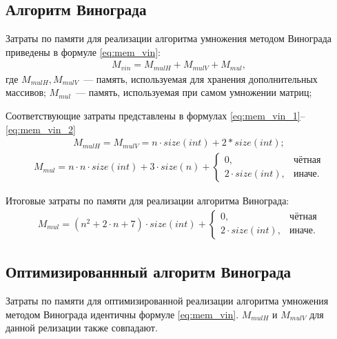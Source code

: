 \subsection*{Алгоритм Винограда}
Затраты по памяти для реализации алгоритма умножения методом Винограда приведены в формуле \ref{eq:mem_vin}:
\begin{equation}
	\label{eq:mem_vin}
	\begin{gathered}
		M_{vin} = M_{mulH} + M_{mulV} + M_{mul},
	\end{gathered}
\end{equation}
где $M_{mulH}, M_{mulV}$~--- память, используемая для хранения дополнительных массивов;
\newline $M_{mul}$~--- память, используемая при самом умножении матриц;

Соответствующие затраты представлены в формулах \ref{eq:mem_vin_1}--\ref{eq:mem_vin_2}
\begin{equation}
	\label{eq:mem_vin_1}
	\begin{gathered}
		M_{mulH} = M_{mulV} = n \cdot size(int) + 2 * size(int);
	\end{gathered}
\end{equation}
\begin{equation}
	\label{eq:mem_vin_2}
	\begin{gathered}
		M_{mul} = n \cdot n \cdot size(int) + 3 \cdot size(n) +
			\begin{cases}
				0, & \text{чётная} \\
				2 \cdot size(int), & \text{иначе}.
			\end{cases}
	\end{gathered}
\end{equation}

Итоговые затраты по памяти для реализации алгоритма Винограда:
\begin{equation}
	\label{eq:mem_vin_res}
	\begin{gathered}
		M_{mul} = (n^{2} + 2 \cdot n + 7) \cdot size(int) +
			\begin{cases}
				0, & \text{чётная} \\
				2 \cdot size(int), & \text{иначе}.
			\end{cases}
	\end{gathered}
\end{equation}

\subsection*{Оптимизированнный алгоритм Винограда}
Затраты по памяти для оптимизированной реализации алгоритма умножения методом Винограда идентичны формуле \ref{eq:mem_vin}.
$M_{mulH}$ и $M_{mulV}$ для данной релизации также совпадают.

